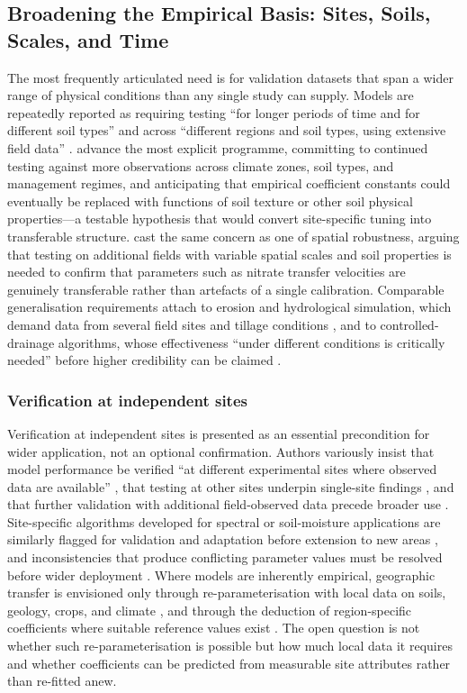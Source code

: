 \documentclass[11pt]{article}
\begin{document}
\subsection{Broadening the Empirical Basis: Sites, Soils, Scales, and Time}

The most frequently articulated need is for validation datasets that span a wider range of physical conditions than any single study can supply. Models are repeatedly reported as requiring testing ``for longer periods of time and for different soil types'' \parencite{Salazar2009} and across ``different regions and soil types, using extensive field data'' \parencite{Li2026}. \textcite{Li2006} advance the most explicit programme, committing to continued testing against more observations across climate zones, soil types, and management regimes, and anticipating that empirical coefficient constants could eventually be replaced with functions of soil texture or other soil physical properties---a testable hypothesis that would convert site-specific tuning into transferable structure. \textcite{Chelil2022} cast the same concern as one of spatial robustness, arguing that testing on additional fields with variable spatial scales and soil properties is needed to confirm that parameters such as nitrate transfer velocities are genuinely transferable rather than artefacts of a single calibration. Comparable generalisation requirements attach to erosion and hydrological simulation, which demand data from several field sites and tillage conditions \parencite{Turunen2020}, and to controlled-drainage algorithms, whose effectiveness ``under different conditions is critically needed'' before higher credibility can be claimed \parencite{Negm2017}.

\subsubsection{Verification at independent sites}

Verification at independent sites is presented as an essential precondition for wider application, not an optional confirmation. Authors variously insist that model performance be verified ``at different experimental sites where observed data are available'' \parencite{Azevedo1997}, that testing at other sites underpin single-site findings \parencite{Qi2015}, and that further validation with additional field-observed data precede broader use \parencite{Kalita1998,Sadhukhan2019b}. Site-specific algorithms developed for spectral or soil-moisture applications are similarly flagged for validation and adaptation before extension to new areas \parencite{Rijal2013}, and inconsistencies that produce conflicting parameter values must be resolved before wider deployment \parencite{Dar2022}. Where models are inherently empirical, geographic transfer is envisioned only through re-parameterisation with local data on soils, geology, crops, and climate \parencite{Azevedo1997}, and through the deduction of region-specific coefficients where suitable reference values exist \parencite{FathAllah2025}. The open question is not whether such re-parameterisation is possible but how much local data it requires and whether coefficients can be predicted from measurable site attributes rather than re-fitted anew.
\end{document}
